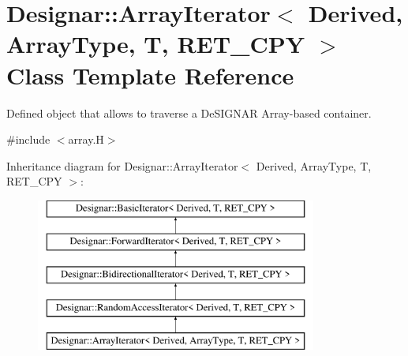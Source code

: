 \hypertarget{class_designar_1_1_array_iterator}{}\section{Designar\+:\+:Array\+Iterator$<$ Derived, Array\+Type, T, R\+E\+T\+\_\+\+C\+PY $>$ Class Template Reference}
\label{class_designar_1_1_array_iterator}


Defined object that allows to traverse a De\+S\+I\+G\+N\+AR Array-\/based container.  




{\ttfamily \#include $<$array.\+H$>$}

Inheritance diagram for Designar\+:\+:Array\+Iterator$<$ Derived, Array\+Type, T, R\+E\+T\+\_\+\+C\+PY $>$\+:\begin{figure}[H]
\begin{center}
\leavevmode
\includegraphics[height=5.000000cm]{class_designar_1_1_array_iterator}
\end{center}
\end{figure}
